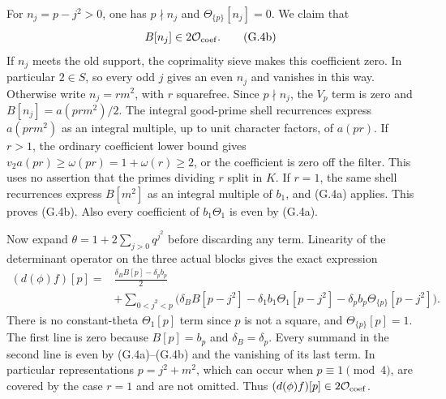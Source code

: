 For $n_j=p-j^2>0$, one has $p\nmid n_j$ and
$\Theta_{\{p\}}[n_j]=0$.  We claim that
\[
                           B[n_j]\in2\mathcal O_{\rm coef}.    \tag{G.4b}
\]
If $n_j$ meets the old support, the coprimality sieve makes this
coefficient zero.  In particular $2\in S$, so every odd $j$ gives
an even $n_j$ and vanishes in this way.  Otherwise write
$n_j=r m^2$, with $r$ squarefree.
Since $p\nmid n_j$, the $V_p$ term is zero and
$B[n_j]=a(prm^2)/2$.  The integral good-prime shell recurrences
express $a(prm^2)$ as an integral multiple, up to unit character
factors, of $a(pr)$.  If $r>1$, the ordinary coefficient lower
bound gives $v_2a(pr)\ge\omega(pr)=1+\omega(r)\ge2$, or the
coefficient is zero off the filter.  This uses no assertion that
the primes dividing $r$ split in $K$.  If $r=1$, the same shell
recurrences express $B[m^2]$ as an integral multiple of $b_1$,
and (G.4a) applies.  This proves (G.4b).  Also every coefficient
of $b_1\Theta_1$ is even by (G.4a).

Now expand $\theta=1+2\sum_{j>0}q^{j^2}$ before discarding any
term.  Linearity of the determinant operator on the three actual
blocks gives the exact expression
\[
\begin{split}
 (d(\phi)f)[p]
 ={}&\frac{\delta_B B[p]-\delta_p b_p}{2}\\
 &+\sum_{0<j^2<p}
 \bigl(\delta_B B[p-j^2]
       -\delta_1 b_1\Theta_1[p-j^2]
       -\delta_p b_p\Theta_{\{p\}}[p-j^2]\bigr).
\end{split}                                                     \tag{G.4c}
\]
There is no constant-theta $\Theta_1[p]$ term since $p$ is not
a square, and $\Theta_{\{p\}}[p]=1$.
The first line is zero because $B[p]=b_p$ and
$\delta_B=\delta_p$.  Every summand in the second line is even
by (G.4a)--(G.4b) and the vanishing of its last term.  In particular
representations $p=j^2+m^2$, which can occur when $p\equiv1\pmod4$,
are covered by the case $r=1$ and are not omitted.  Thus
$(d(\phi)f)[p]\in2\mathcal O_{\rm coef}$.

